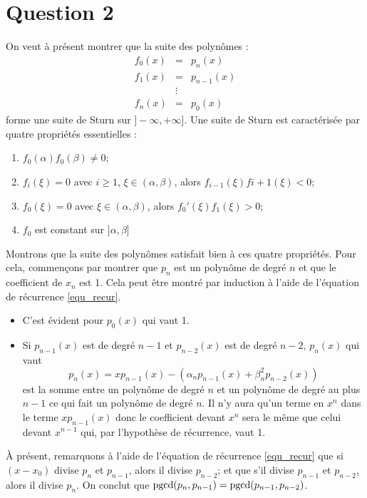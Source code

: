 \section*{Question 2}
On veut à présent montrer que la suite des polynômes :
$$
\begin{array}{ccc}
f_0(x) & = & p_n(x)\\
f_1(x) & = & p_{n-1}(x)\\
&\vdots &\\
f_n(x) & = & p_0(x)
\end{array}
$$
forme une suite de Sturn sur $] - \infty, +\infty]$. Une suite de Sturn est caractérisée par quatre propriétés essentielles :

\begin{enumerate}
  \item $f_0(\alpha) f_0(\beta) \neq 0$;
  \item $f_i( \xi)=0$ avec $i \geq 1$, $\xi \in (\alpha, \beta)$, alors $f_{i-1}( \xi) f{i+1}( \xi) <0$;
  \item $f_0( \xi )=0 $ avec $\xi \in (\alpha, \beta)$, alors $f_0'( \xi ) f_1( \xi ) >0$;
  \item $f_0$ est constant sur $] \alpha, \beta]$
\end{enumerate}

Montrons que la suite des polynômes satisfait bien à ces quatre propriétés.
Pour cela, commençons par montrer que $p_n$ est un polynôme de degré $n$
et que le coefficient de $x_n$ est 1.
Cela peut être montré par induction à l'aide de l'équation de récurrence
\eqref{equ_recur}.

\begin{itemize}
  \item C'est évident pour $p_0(x)$ qui vaut 1.
  \item Si $p_{n-1}(x)$ est de degré $n-1$ et $p_{n-2}(x)$ est de degré
    $n-2$, $p_n(x)$ qui vaut
    \[ p_n(x) = xp_{n-1}(x) - (\alpha_np_{n-1}(x) + \beta_n^2p_{n-2}(x)) \]
    est la somme entre un polynôme de degré $n$ et un polynôme de
    degré au plus $n-1$ ce qui fait un polynôme de degré $n$.
    Il n'y aura qu'un terme en $x^n$ dans le terme $xp_{n-1}(x)$ donc
    le coefficient devant $x^n$ sera le même que celui devant $x^{n-1}$ qui,
    par l'hypothèse de récurrence, vaut 1.
\end{itemize}


À présent, remarquons à l'aide de l'équation de récurrence \eqref{equ_recur}
que si $(x-x_0)$ divise $p_n$ et $p_{n-1}$, alors il divise
$p_{n-2}$; et que s'il divise $p_{n-1}$ et $p_{n-2}$, alors il divise $p_n$.
On conclut que $\operatorname{pgcd}(p_n, p_{n-1}) = \operatorname{pgcd}(p_{n-1}, p_{n-2})$.


